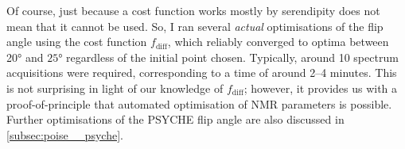 Of course, just because a cost function works mostly by serendipity does not mean that it cannot be used.
    So, I ran several \textit{actual} optimisations of the flip angle using the cost function $f_\text{diff}$, which reliably converged to optima between \ang{20} and $\ang{25}$ regardless of the initial point chosen.
Typically, around 10 spectrum acquisitions were required, corresponding to a time of around 2--4 minutes.
This is not surprising in light of our knowledge of $f_\text{diff}$; however, it provides us with a proof-of-principle that automated optimisation of NMR parameters is possible.
Further optimisations of the PSYCHE flip angle are also discussed in \cref{subsec:poise__psyche}.
